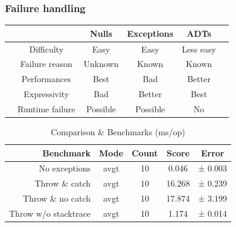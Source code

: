 \begin{frame}
  \frametitle{Failure handling}

  \begin{table}[h]
    \centering
    \begin{tabular}{cccccc}
      \toprule
       &                 & \textbf{Null}s & \textbf{Exception}s & \textbf{ADT}s & \\
      \midrule
       & Difficulty      & Easy           & Easy                & Less easy     & \\
       & Failure reason  & Unknown        & Known               & Known         & \\
       & Performances    & Best           & Bad                 & Better        & \\
       & Expressivity    & Bad            & Better              & Best          & \\
       & Runtime failure & Possible       & Possible            & No            & \\
    \end{tabular}
  \end{table}


  \begin{table}[h]
    \centering
    \begin{tabular}{rcccc}
      \textbf{Benchmark}   & \textbf{Mode} & \textbf{Count} & \textbf{Score} & \textbf{Error} \\
      \midrule
      No exceptions        & avgt          & 10             & 0.046          & ± 0.003        \\
      Throw \& catch       & avgt          & 10             & 16.268         & ± 0.239        \\
      Throw \& no catch    & avgt          & 10             & 17.874         & ± 3.199        \\
      Throw w/o stacktrace & avgt          & 10             & 1.174          & ± 0.014        \\
      \bottomrule
    \end{tabular}
    \caption{Comparison \& Benchmarks (ms/op)}
  \end{table}
\end{frame}

